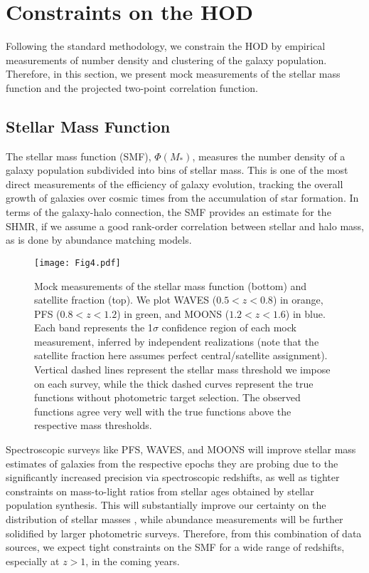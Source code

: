 \documentclass[twocolumn,twocolappendix]{aastex63}
\begin{document}
\section{Constraints on the HOD}
\label{sec:constraints}


Following the standard methodology, we constrain the HOD by empirical measurements of number density and clustering of the galaxy population. Therefore, in this section, we present mock measurements of the stellar mass function and the projected two-point correlation function.

\subsection{Stellar Mass Function}
\label{sec:smf}

The stellar mass function (SMF), $\Phi(M_\ast)$, measures the number density of a galaxy population subdivided into bins of stellar mass. This is one of the most direct measurements of the efficiency of galaxy evolution, tracking the overall growth of galaxies over cosmic times from the accumulation of star formation. In terms of the galaxy-halo connection, the SMF provides an estimate for the SHMR, if we assume a good rank-order correlation between stellar and halo mass, as is done by abundance matching models.

\begin{figure}[ht!]
\texttt{[image: Fig4.pdf]}
\caption{Mock measurements of the stellar mass function (bottom) and satellite fraction (top). We plot WAVES ($0.5 < z < 0.8$) in orange, PFS ($0.8 < z < 1.2$) in green, and MOONS ($1.2 < z < 1.6$) in blue. Each band represents the 1$\sigma$ confidence region of each mock measurement, inferred by independent realizations (note that the satellite fraction here assumes perfect central/satellite assignment). Vertical dashed lines represent the stellar mass threshold we impose on each survey, while the thick dashed curves represent the true functions without photometric target selection. The observed functions agree very well with the true functions above the respective mass thresholds.
\label{fig:smf}}
\end{figure}

Spectroscopic surveys like PFS, WAVES, and MOONS will improve stellar mass estimates of galaxies from the respective epochs they are probing due to the significantly increased precision via spectroscopic redshifts, as well as tighter constraints on mass-to-light ratios from stellar ages obtained by stellar population synthesis. This will substantially improve our certainty on the distribution of stellar masses \citep{Muzzin:2009}, while abundance measurements will be further solidified by larger photometric surveys. Therefore, from this combination of data sources, we expect tight constraints on the SMF for a wide range of redshifts, especially at $z > 1$, in the coming years.
\end{document}
